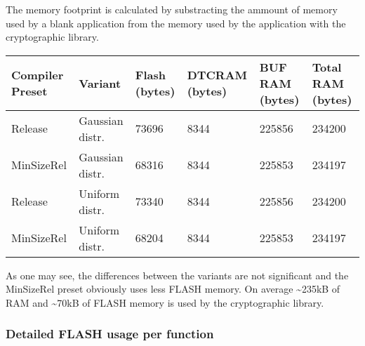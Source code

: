 \documentclass[
]{article}
\begin{document}
The memory footprint is calculated by substracting the ammount of memory
used by a blank application from the memory used by the application with
the cryptographic library.

\begin{longtable}[]{@{}llllll@{}}
\toprule
Compiler Preset & Variant & Flash (bytes) & DTCRAM (bytes) & BUF RAM
(bytes) & Total RAM (bytes)\tabularnewline
\midrule
\endhead
Release & Gaussian distr. & 73696 & 8344 & 225856 &
234200\tabularnewline
MinSizeRel & Gaussian distr. & 68316 & 8344 & 225853 &
234197\tabularnewline
Release & Uniform distr. & 73340 & 8344 & 225856 & 234200\tabularnewline
MinSizeRel & Uniform distr. & 68204 & 8344 & 225853 &
234197\tabularnewline
\bottomrule
\end{longtable}

As one may see, the differences between the variants are not significant
and the MinSizeRel preset obviously uses less FLASH memory. On average
\textasciitilde235kB of RAM and \textasciitilde70kB of FLASH memory is
used by the cryptographic library.

\hypertarget{detailed-flash-usage-per-function}{%
\subsubsection{Detailed FLASH usage per
function}\label{detailed-flash-usage-per-function}}
\end{document}

